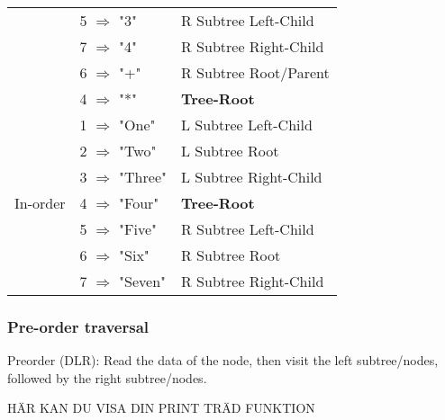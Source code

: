 \documentclass[a4paper, 11pt]{article}
\begin{document}
\begin{tabular}{|l|l|l|}
                                      & 5 $\Rightarrow$ "3"         & R Subtree Left-Child\\
                                      & 7 $\Rightarrow$ "4"         & R Subtree Right-Child\\
                                      & 6 $\Rightarrow$ "+"         & R Subtree Root/Parent\\\
                                      & 4 $\Rightarrow$ "*"         & \textbf{Tree-Root} \\
        \hline
        \multirow{7}{*}{In-order}     & 1 $\Rightarrow$ "One"       & L Subtree Left-Child\\
                                      & 2 $\Rightarrow$ "Two"       & L Subtree Root\\
                                      & 3 $\Rightarrow$ "Three"     & L Subtree Right-Child\\
                                      & 4 $\Rightarrow$ "Four"      & \textbf{Tree-Root} \\
                                      & 5 $\Rightarrow$ "Five"      & R Subtree Left-Child\\
                                      & 6 $\Rightarrow$ "Six"       & R Subtree Root\\
                                      & 7 $\Rightarrow$ "Seven"     & R Subtree Right-Child\\
        \hline
    \end{tabular}

    \subsubsection*{Pre-order traversal}
    
    Preorder (DLR): Read the data of the node, then visit the left
    subtree/nodes, followed by the right subtree/nodes.

    HÄR KAN DU VISA DIN PRINT TRÄD FUNKTION
\end{document}
